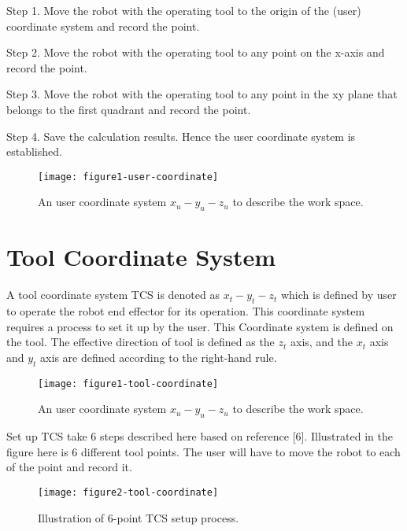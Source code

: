 \documentclass[conference]{IEEEtran}
\begin{document}
Step 1. Move the robot with the operating tool to 
the origin of the (user) coordinate system and record 
the point.

Step 2. Move the robot with the operating tool to 
any point on the x-axis and record the point.

Step 3. Move the robot with the operating tool to any 
point in the xy plane that belongs to the first 
quadrant and record the point.

Step 4. Save the calculation results. Hence the user
coordinate system is established. 

\begin{figure}[H] 
\centering
\texttt{[image: figure1-user-coordinate]}  
\caption{An user coordinate system $x_u-y_u-z_u$ 
to describe the work space.}
\label{figure1-user-coordinate} 
\end{figure}

\section{Tool Coordinate System}
A tool coordinate system TCS is denoted 
as $x_t-y_t-z_t$ which is defined
by user to operate the robot
end effector for its operation. This coordinate system 
requires a process to set it up by the user. 
This Coordinate system is defined on the tool.   
The effective direction of tool is defined as the $z_t$ axis, 
and the $x_t$ axis and $y_t$ axis are defined according to 
the right-hand rule.
\begin{figure}[H] 
\centering
\texttt{[image: figure1-tool-coordinate]}  
\caption{An user coordinate system $x_u-y_u-z_u$ 
to describe the work space.}
\label{figure1-tool-coordinate} 
\end{figure}

Set up TCS take 6 steps described here based on reference 
[6]. Illustrated in the figure here is 6 different tool 
points. The user will have to move the robot to each of 
the point and record it. 
\begin{figure}[H] 
\centering
\texttt{[image: figure2-tool-coordinate]}  
\caption{Illustration of 6-point TCS setup process.}
\label{figure2-tool-coordinate} 
\end{figure}
\end{document}
